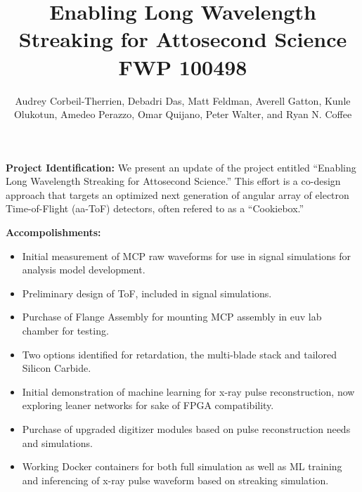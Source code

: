 \documentclass[aps]{revtex4}
\begin{document}
\title{Enabling Long Wavelength Streaking for Attosecond Science\\FWP 100498}

\author{Audrey Corbeil-Therrien, Debadri Das, Matt Feldman, Averell Gatton, Kunle Olukotun, Amedeo Perazzo, Omar Quijano, Peter Walter, and Ryan N. Coffee}

\newlength{\figwidth}
\setlength{\figwidth}{.9\linewidth}

\maketitle

\textbf{Project Identification: }
We present an update of the project entitled ``Enabling Long Wavelength Streaking for Attosecond Science.''
This effort is a co-design approach that targets an optimized next generation of angular array of electron Time-of-Flight (aa-ToF) detectors, often refered to as a ``Cookiebox.''

\textbf{Accompolishments: }
\begin{itemize}
\setlength\itemsep{-0.25em}
\item Initial measurement of MCP raw waveforms for use in signal simulations for analysis model development.
\item Preliminary design of ToF, included in signal simulations.
\item Purchase of Flange Assembly for mounting MCP assembly in euv lab chamber for testing.
\item Two options identified for retardation, the multi-blade stack and tailored Silicon Carbide.
\item Initial demonstration of machine learning for x-ray pulse reconstruction, now exploring leaner networks for sake of FPGA compatibility.
\item Purchase of upgraded digitizer modules based on pulse reconstruction needs and simulations.
\item Working Docker containers for both full simulation as well as ML training and inferencing of x-ray pulse waveform based on streaking simulation.
\end{itemize}
\end{document}
